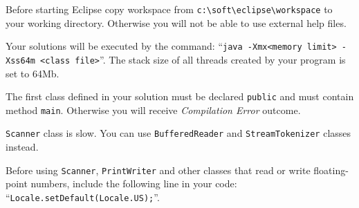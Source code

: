 \ifdefined\online
\else
    Before starting Eclipse copy workspace from \verb|c:\soft\eclipse\workspace| to
    your working directory.
    Otherwise you will not be able to use external help files.
\fi

Your solutions will be executed by the command:
``\verb|java -Xmx<memory limit> -Xss64m <class file>|''.
The stack size of all threads created by your program is set to 64Mb.

The first class defined in your solution must be declared \texttt{public}
and must contain method \verb|main|. Otherwise you will receive
\emph{Compilation Error} outcome.

\verb|Scanner| class is slow. You can use \verb|BufferedReader| and
\verb|StreamTokenizer| classes instead.

Before using \verb|Scanner|, \verb|PrintWriter| and other classes that read
or write floating-point numbers, include the following line in your code:
``\verb|Locale.setDefault(Locale.US);|''.
